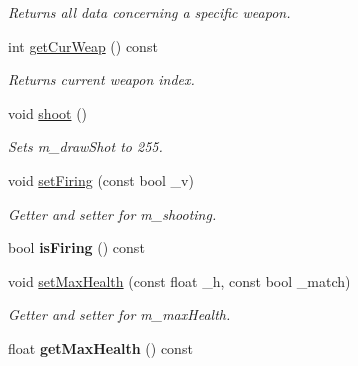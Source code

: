 \begin{DoxyCompactItemize}
\begin{DoxyCompactList}\small\item\em Returns all data concerning a specific weapon. \end{DoxyCompactList}\item 
\hypertarget{classship_ab6eddbf0796ca30adc6ac81927abc750}{int \hyperlink{classship_ab6eddbf0796ca30adc6ac81927abc750}{get\-Cur\-Weap} () const }\label{classship_ab6eddbf0796ca30adc6ac81927abc750}

\begin{DoxyCompactList}\small\item\em Returns current weapon index. \end{DoxyCompactList}\item 
\hypertarget{classship_aeb88d49d9a8cfb5d7f36665f1ff18858}{void \hyperlink{classship_aeb88d49d9a8cfb5d7f36665f1ff18858}{shoot} ()}\label{classship_aeb88d49d9a8cfb5d7f36665f1ff18858}

\begin{DoxyCompactList}\small\item\em Sets m\-\_\-draw\-Shot to 255. \end{DoxyCompactList}\item 
\hypertarget{classship_ad9ca88b4655b003dafb719cec3481efb}{void \hyperlink{classship_ad9ca88b4655b003dafb719cec3481efb}{set\-Firing} (const bool \-\_\-v)}\label{classship_ad9ca88b4655b003dafb719cec3481efb}

\begin{DoxyCompactList}\small\item\em Getter and setter for m\-\_\-shooting. \end{DoxyCompactList}\item 
\hypertarget{classship_a694bdcef07e84d7f581f1c2cbf7d6a79}{bool {\bfseries is\-Firing} () const }\label{classship_a694bdcef07e84d7f581f1c2cbf7d6a79}

\item 
\hypertarget{classship_a6a8eef4a53c952a18de54e9083b35dbd}{void \hyperlink{classship_a6a8eef4a53c952a18de54e9083b35dbd}{set\-Max\-Health} (const float \-\_\-h, const bool \-\_\-match)}\label{classship_a6a8eef4a53c952a18de54e9083b35dbd}

\begin{DoxyCompactList}\small\item\em Getter and setter for m\-\_\-max\-Health. \end{DoxyCompactList}\item 
\hypertarget{classship_a995188d2c9128c440ac34b316e6bfdf5}{float {\bfseries get\-Max\-Health} () const }\label{classship_a995188d2c9128c440ac34b316e6bfdf5}


\end{DoxyCompactItemize}
